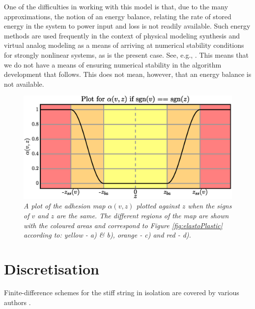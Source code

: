 \documentclass[twoside,a4paper,dvipsnames]{article}
\begin{document}
One of the difficulties in working with this model is that, due to the many approximations, the notion of an energy balance, relating the rate of stored energy in the system to power input and loss is not readily available. Such energy methods are used frequently in the context of physical modeling synthesis and virtual analog modeling as a means of arriving at numerical stability conditions for strongly nonlinear systems, as is the present case. See, e.g., \cite{Bilbao2009}. This means that we do not have a means of ensuring numerical stability in the algorithm development that follows. This does not mean, however, that an energy balance is not available. 

\begin{figure}[ht]
\centerline{\includegraphics[width=1.0\columnwidth]{drawAlpha3.eps}}
\caption{\label{fig:alphaPlot}{\it A plot of the adhesion map $\alpha(v,z)$ plotted against $z$ when the signs of $v$ and $z$ are the same. The different regions of the map are shown with the coloured areas and correspond to Figure \ref{fig:elastoPlastic} according to: yellow - a) \& b), orange - c) and red - d).}}
\end{figure}

\section{Discretisation}\label{sec:discretisation}
Finite-difference schemes for the stiff string in isolation are covered by various authors \cite{Chaigne, Bilbao2009}. 
\end{document}
